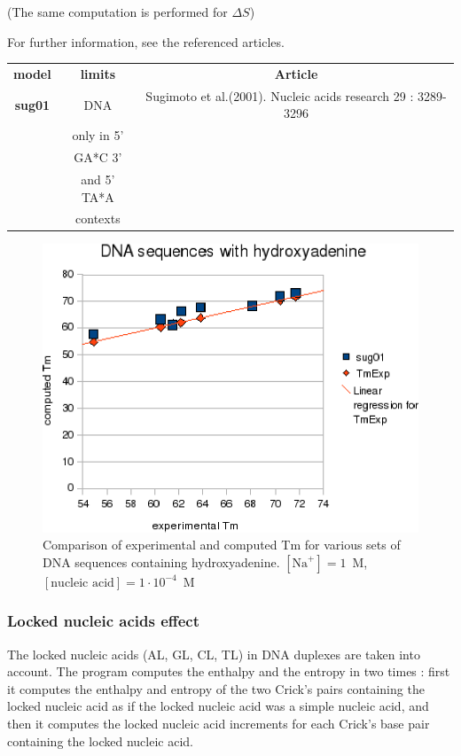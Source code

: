 \documentclass{article}
\begin{document}
       (The same computation is performed for $\Delta S$) 
       
For further information, see the referenced articles.

\begin{table}[h]
\begin{tabular}[h]{| c | c | c |}
\textbf{model} & \textbf{limits} & \textbf{Article} \\
\textbf{sug01} & DNA & Sugimoto et al.(2001). Nucleic acids research 29 : 3289-3296\\
 & only in 5' & \\
 & GA*C 3' & \\
 & and 5' TA*A & \\
 & contexts & \\
\end{tabular}
\end{table}

\begin{figure}[h]
\includegraphics{images/Hydroxyadenine.eps}
\caption{Comparison of experimental and computed Tm for various sets of
 DNA sequences containing hydroxyadenine. $[\mbox{Na}^+] = 1$~M, $[\mbox{nucleic acid}] = 1\cdot{}10^{-4}$~M}
\end{figure}

\subsubsection{Locked nucleic acids effect}

The locked nucleic acids (AL, GL, CL, TL) in DNA duplexes are taken into account.
The program computes the enthalpy and the entropy in two times : first it computes the enthalpy and entropy of 
the two Crick's pairs containing the locked nucleic acid as if the locked nucleic acid was a simple nucleic acid,
and then it computes the locked nucleic acid increments for each Crick's base pair containing the locked nucleic acid.
\end{document}
